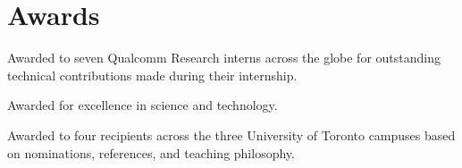 \section{\sc Awards}

{
  Awarded to seven Qualcomm Research interns across the globe for outstanding technical contributions made during their internship.
}

{
  Awarded for excellence in science and technology.
}

{
  Awarded to four recipients across the three University of Toronto campuses based on nominations, references, and teaching philosophy.
}

